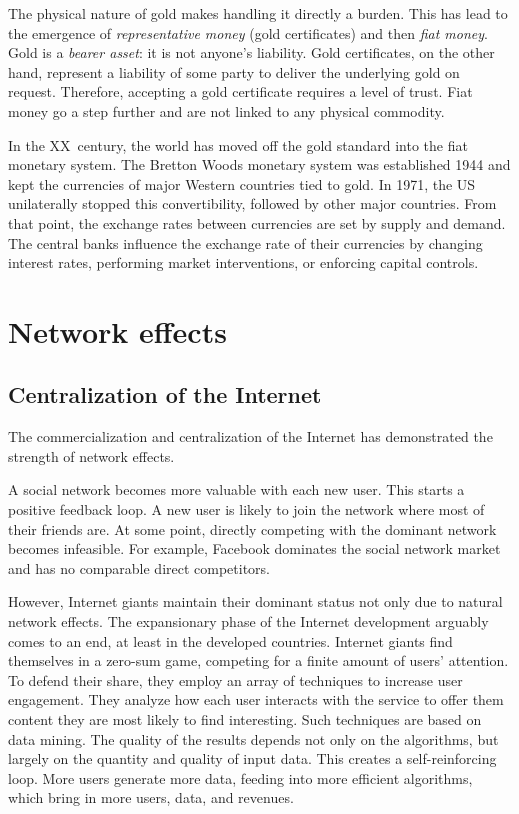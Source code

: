 The physical nature of gold makes handling it directly a burden.
This has lead to the emergence of \textit{representative money} (gold certificates) and then \textit{fiat money}. 
Gold is a \textit{bearer asset}: it is not anyone's liability.
Gold certificates, on the other hand, represent a liability of some party to deliver the underlying gold on request.
Therefore, accepting a gold certificate requires a level of trust.
Fiat money go a step further and are not linked to any physical commodity.

In the XX~century, the world has moved off the gold standard into the fiat monetary system.
The Bretton Woods monetary system was established 1944 and kept the currencies of major Western countries tied to gold.
In 1971, the US unilaterally stopped this convertibility, followed by other major countries.
From that point, the exchange rates between currencies are set by supply and demand.
The central banks influence the exchange rate of their currencies by changing interest rates, performing market interventions, or enforcing capital controls.


\section{Network effects}

\subsection{Centralization of the Internet}

The commercialization and centralization of the Internet has demonstrated the strength of network effects.

A social network becomes more valuable with each new user.
This starts a positive feedback loop.
A new user is likely to join the network where most of their friends are.
At some point, directly competing with the dominant network becomes infeasible.
For example, Facebook dominates the social network market and has no comparable direct competitors.

However, Internet giants maintain their dominant status not only due to natural network effects.
The expansionary phase of the Internet development arguably comes to an end, at least in the developed countries.
Internet giants find themselves in a zero-sum game, competing for a finite amount of users' attention.
To defend their share, they employ an array of techniques to increase user engagement.
They analyze how each user interacts with the service to offer them content they are most likely to find interesting.
Such techniques are based on data mining.
The quality of the results depends not only on the algorithms, but largely on the quantity and quality of input data.
This creates a self-reinforcing loop.
More users generate more data, feeding into more efficient algorithms, which bring in more users, data, and revenues.

